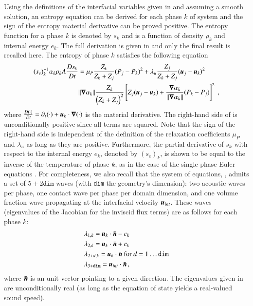 \documentclass[preprint,10pt]{elsarticle}
\begin{document}
%
Using the definitions of the interfacial variables given in  and assuming a smooth solution, an entropy equation can be 
derived for each phase $k$ of system  and the sign of the entropy material derivative can be proved positive. 
The entropy function for a phase $k$ is denoted by $s_k$ and is a function of 
density $\rho_k$ and internal energy $e_k$. The full derivation is given in \cite{Marco_paper_sem} and only the final result is recalled here. 
The entropy of phase $k$ satisfies the following equation
%
\begin{align} \label{eq:ent-eqn-7-eqn}
(s_{e})_k^{-1} \alpha_k \rho_k A \frac{Ds_k}{Dt} &= \mu_P \frac{Z_k}{Z_k+Z_j} (P_j - P_k)^2 + \lambda_u \frac{Z_j}{Z_k+Z_j} (\boldsymbol u_j -\boldsymbol u_k)^2 
\nonumber
\\
& \| \boldsymbol\nabla \alpha_k \| \frac{Z_k}{\left( Z_k+Z_j \right)^2} \left[ Z_j (\boldsymbol u_j-\boldsymbol u_k)+\frac{\boldsymbol\nabla \alpha_k}{\| \boldsymbol\nabla \alpha_k \|}(P_k-P_j)\right]^2 \ ,
\end{align}
%
where $\frac{D(\cdot) }{Dt} = \partial_t (\cdot) + \boldsymbol u_k \cdot \boldsymbol\nabla (\cdot)$ is the material derivative.
The right-hand side of  is unconditionally positive since all terms are squared. Note that the sign of the right-hand side is independent of 
the definition of the 
relaxation coefficients $\mu_P$ and $\lambda_u$ as long as they are positive. Furthermore, 
the partial derivative of $s_k$ with respect to the internal energy $e_k$, denoted by $(s_e)_k$, is shown to be equal to the inverse of the temperature 
of phase $k$, as in the case of the single phase Euler equations \cite{GuermondSIAM2014, Marco_dissertation}. For completeness, we also recall that the system of equations, 
, 
admits a set of $5+2\texttt{dim}$ waves (with \texttt{dim} the geometry's dimension): 
two acoustic waves per phase, one contact wave per phase per domain dimension, and one volume fraction wave propagating 
at the interfacial velocity $\boldsymbol u_{int}$. These waves (eigenvalues of the Jacobian for the inviscid flux terms) are as follows for each phase $k$:
% 
\begin{align}\label{eq:eigenvalues}
&\lambda_{1,k} = \boldsymbol u_k \cdot \bar{\boldsymbol n} - c_k \nonumber\\
&\lambda_{2,k} = \boldsymbol u_k \cdot \bar{\boldsymbol n} + c_k \nonumber\\
&\lambda_{2+d,k} = \boldsymbol u_k \cdot \bar{\boldsymbol n} \text{ for } d = 1 \dots \texttt{dim} \\
&\lambda_{3+\texttt{dim}} = \boldsymbol u_{int} \cdot \bar{\boldsymbol n} \nonumber \,,
\end{align}
%
where $\bar{\boldsymbol n}$ is an unit vector pointing to a given direction. The eigenvalues given in  are unconditionally 
real (as long as the equation of state yields a real-valued sound speed).
\end{document}
